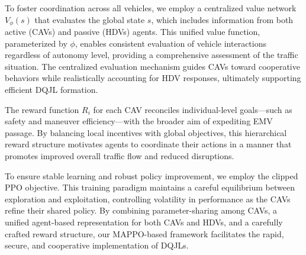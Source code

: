 To foster coordination across all vehicles, we employ a centralized value network \(V_{\phi}(s)\) that evaluates the global state \(s\), which includes information from both active (CAVs) and passive (HDVs) agents. This unified value function, parameterized by \(\phi\), enables consistent evaluation of vehicle interactions regardless of autonomy level, providing a comprehensive assessment of the traffic situation. The centralized evaluation mechanism guides CAVs toward cooperative behaviors while realistically accounting for HDV responses, ultimately supporting efficient DQJL formation.

The reward function \(R_i\) for each CAV reconciles individual-level goals—such as safety and maneuver efficiency—with the broader aim of expediting EMV passage. By balancing local incentives with global objectives, this hierarchical reward structure motivates agents to coordinate their actions in a manner that promotes improved overall traffic flow and reduced disruptions.

To ensure stable learning and robust policy improvement, we employ the clipped PPO objective. This training paradigm maintains a careful equilibrium between exploration and exploitation, controlling volatility in performance as the CAVs refine their shared policy. By combining parameter-sharing among CAVs, a unified agent-based representation for both CAVs and HDVs, and a carefully crafted reward structure, our MAPPO-based framework facilitates the rapid, secure, and cooperative implementation of DQJLs.

